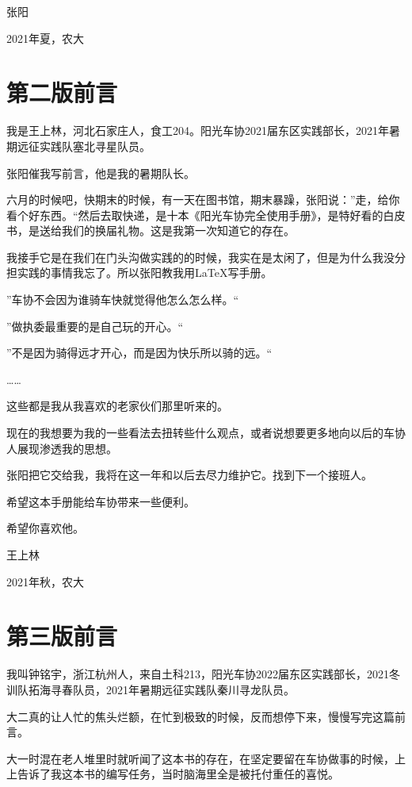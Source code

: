 \documentclass{ctexbook}
\begin{document}
\hfill 张\hspace{3mm}阳 \hspace{10mm}

\hfill 2021年夏，农大\hspace{2mm}


\chapter{第二版前言}
我是王上林，河北石家庄人，食工204。阳光车协2021届东区实践部长，2021年暑期远征实践队塞北寻星队员。

张阳催我写前言，他是我的暑期队长。

六月的时候吧，快期末的时候，有一天在图书馆，期末暴躁，张阳说：''走，给你看个好东西。``然后去取快递，是十本《阳光车协完全使用手册》，是特好看的白皮书，是送给我们的换届礼物。这是我第一次知道它的存在。

我接手它是在我们在门头沟做实践的的时候，我实在是太闲了，但是为什么我没分担实践的事情我忘了。所以张阳教我用\LaTeX 写手册。

''车协不会因为谁骑车快就觉得他怎么怎么样。``

''做执委最重要的是自己玩的开心。``

''不是因为骑得远才开心，而是因为快乐所以骑的远。``

……

这些都是我从我喜欢的老家伙们那里听来的。

现在的我想要为我的一些看法去扭转些什么观点，或者说想要更多地向以后的车协人展现渗透我的思想。

张阳把它交给我，我将在这一年和以后去尽力维护它。找到下一个接班人。

希望这本手册能给车协带来一些便利。

希望你喜欢他。

\hfill 王\hspace{3mm}上\hspace{3mm}林 \hspace{10mm}

\hfill 2021年秋，农大\hspace{2mm}
\chapter{第三版前言}
我叫钟铭宇，浙江杭州人，来自土科213，阳光车协2022届东区实践部长，2021冬训队拓海寻春队员，2021年暑期远征实践队秦川寻龙队员。

大二真的让人忙的焦头烂额，在忙到极致的时候，反而想停下来，慢慢写完这篇前言。

大一时混在老人堆里时就听闻了这本书的存在，在坚定要留在车协做事的时候，上上告诉了我这本书的编写任务，当时脑海里全是被托付重任的喜悦。
\end{document}
